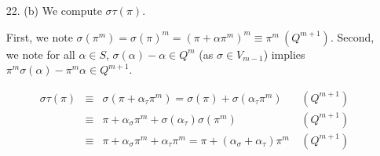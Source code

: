 \documentclass{article}
\newcommand{\modequiv}[3]{#1 \equiv #2\ (#3)}
\newtheorem{lemma}{Lemma}
\begin{document}
\begin{enumerate}
\begin{lemma}
    If $\modequiv{x}{\sigma(\pi)}{Q^{m+1}}$ and $\sigma \in V_{m - 1}$, then $x - \pi \in Q^{m}$.
\end{lemma}
\begin{proof}
    Since $\sigma \in V_{m-1}$, $\sigma(\pi) - \pi \in Q^{m}$; therefore $\pi\sigma(\pi) - \pi^2 \in Q^{m+1}$.  As $\sigma(\pi) - x \in Q^{m+1}$, $\pi\sigma(\pi) - \pi x \in Q^{m+1}$: subtracting this from $\pi\sigma(\pi) - \pi^2$ shows $\pi x - \pi^2 = \pi(x - \pi)\in Q^{m+1}$.  Since $\pi \not \in Q^2$, $x - \pi \in Q^{m}$.
\end{proof}

As in 21 (a), we split the proof into two parts based on whether $\pi$ generates $Q$ or not.

Suppose $(\pi) = Q$.  Then by the above lemma $x - \pi \in Q^{m}$ and so $x = \pi + \alpha \pi^{m}$ for some $\alpha$.  Therefore $\modequiv{\sigma(\pi)}{\pi + \alpha \pi^{m}}{Q^{m}}$.

If instead $(\pi) = QI$, take $x$ be a solution to the system of congruences
\[
    \begin{array}{llll}
        x &\equiv& \sigma(\pi) \ & (Q^{m+1}) \\
        x &\equiv& \pi\ & (I^m) \\
    \end{array}
\]

By the above lemma $x - \pi \in Q^{m}$, so $x - \pi \in Q^{m} \cap I^{m} = Q^m I^m = (\pi)^m$, $x - \pi = \alpha \pi^m$ for some $\alpha$.  Therefore $\modequiv{\sigma(\pi)}{\pi + \alpha \pi^m}{Q^{m + 1}}$ as required.

\item [22. (b)]  We compute $\sigma\tau(\pi)$.

First, we note $\sigma(\pi^m) = \sigma(\pi)^m= (\pi + \alpha \pi^{m})^{m} \equiv \pi^m \ (Q^{m + 1})$.
Second, we note for all $\alpha \in S$, $\sigma(\alpha) - \alpha \in Q^{m}$ (as $\sigma \in V_{m-1}$) implies $\pi^{m}\sigma(\alpha) - \pi^{m}\alpha \in Q^{m + 1}$.

\[
\begin{array}{cccc}
    \sigma\tau(\pi) &\equiv& \sigma(\pi + \alpha_{\tau} \pi^{m}) = \sigma(\pi) + \sigma(\alpha_{\tau}\pi^{m}) & \ (Q^{m + 1}) \\
    &\equiv& \pi + \alpha_{\sigma}\pi^{m} + \sigma(\alpha_{\tau})\sigma(\pi^m) & \ (Q^{m+1}) \\
    &\equiv& \pi + \alpha_{\sigma}\pi^{m} + \alpha_{\tau}\pi^{m} = \pi + (\alpha_{\sigma} + \alpha_{\tau})\pi^m & \ (Q^{m + 1}) \\
\end{array}
\]


\end{enumerate}
\end{document}
